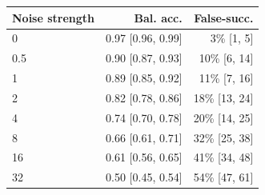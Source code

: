 \begin{tabular}{lrr}
\toprule
Noise strength & Bal. acc. & False-succ. \\
\midrule
0 & 0.97 [0.96, 0.99] & 3\% [1, 5] \\
0.5 & 0.90 [0.87, 0.93] & 10\% [6, 14] \\
1 & 0.89 [0.85, 0.92] & 11\% [7, 16] \\
2 & 0.82 [0.78, 0.86] & 18\% [13, 24] \\
4 & 0.74 [0.70, 0.78] & 20\% [14, 25] \\
8 & 0.66 [0.61, 0.71] & 32\% [25, 38] \\
16 & 0.61 [0.56, 0.65] & 41\% [34, 48] \\
32 & 0.50 [0.45, 0.54] & 54\% [47, 61] \\
\bottomrule
\end{tabular}